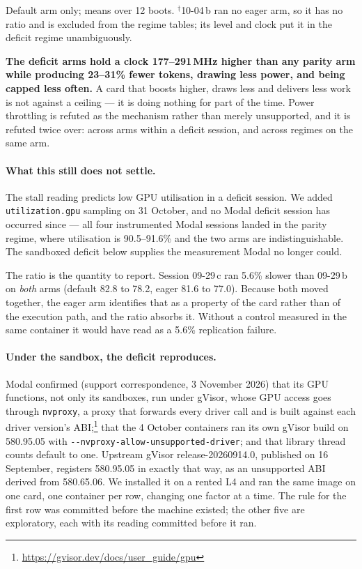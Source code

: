 \documentclass[11pt]{article}
\newcommand{\tw}[1]{\texttt{\small #1}}
\begin{document}
\noindent
Default arm only; means over 12 boots. $^\dagger$10-04\,b ran no eager arm,
so it has no ratio and is excluded from the regime tables; its level and
clock put it in the deficit regime unambiguously.

\textbf{The deficit arms hold a clock 177--291\,MHz higher than any parity
arm while producing 23--31\% fewer tokens, drawing less power, and being
capped less often.} A card that boosts higher, draws less and delivers less
work is not against a ceiling --- it is doing nothing for part of the time.
Power throttling is refuted as the mechanism rather than merely unsupported,
and it is refuted twice over: across arms within a deficit session, and
across regimes on the same arm.

\paragraph{What this still does not settle.} The stall reading predicts low
GPU utilisation in a deficit session. We added \tw{utilization.gpu} sampling
on 31 October, and no Modal deficit session has occurred since --- all four
instrumented Modal sessions landed in the parity regime, where utilisation is
90.5--91.6\% and the two arms are indistinguishable. The sandboxed deficit
below supplies the measurement Modal no longer could.

The ratio is the quantity to report. Session 09-29\,c ran 5.6\% slower than
09-29\,b on \emph{both} arms (default 82.8 to 78.2, eager 81.6 to 77.0).
Because both moved together, the eager arm identifies that as a property of
the card rather than of the execution path, and the ratio absorbs it. Without
a control measured in the same container it would have read as a 5.6\%
replication failure.

\paragraph{Under the sandbox, the deficit reproduces.} Modal confirmed
(support correspondence, 3 November 2026) that its GPU functions, not only
its sandboxes, run under gVisor, whose GPU access goes through \tw{nvproxy},
a proxy that forwards every driver call and is built against each driver
version's ABI;\footnote{\url{https://gvisor.dev/docs/user_guide/gpu}} that the
4 October containers ran its own gVisor build on 580.95.05 with
\tw{-{}-nvproxy-allow-unsupported-driver}; and that library thread counts
default to one. Upstream gVisor release-20260914.0, published on
16 September, registers 580.95.05 in exactly that way, as an unsupported ABI
derived from 580.65.06. We installed it on a rented L4 and ran the same image
on one card, one container per row, changing one factor at a time. The rule
for the first row was committed before the machine existed; the other five
are exploratory, each with its reading committed before it ran.
\end{document}
